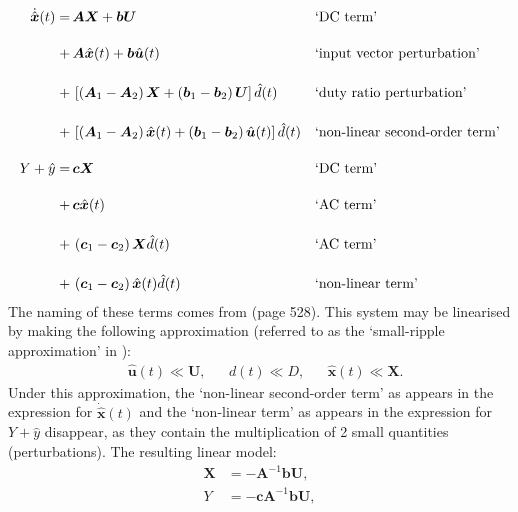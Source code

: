 \begin{align*}
\dot{\hat{\boldsymbol{x}}}(t)
= \, &\boldsymbol{A} \boldsymbol{X} + \boldsymbol{b} \boldsymbol{U}
&&\text{`DC term'}
\\[11pt]
+ \, &\boldsymbol{A} \hat{\boldsymbol{x}}(t) + \boldsymbol{b} \hat{\boldsymbol{u}}(t)
&&\text{`input vector perturbation'}
\\[11pt]
+ \, &\left[\left(\boldsymbol{A}_1 - \boldsymbol{A}_2\right)\boldsymbol{X} + \left(\boldsymbol{b}_1 - \boldsymbol{b}_2\right)\boldsymbol{U}\right] \hat{d}(t)
&&\text{`duty ratio perturbation'}
\\[11pt]
+ \, &\left[\left(\boldsymbol{A}_1 - \boldsymbol{A}_2\right)\hat{\boldsymbol{x}}(t) + \left(\boldsymbol{b}_1 - \boldsymbol{b}_2\right)\hat{\boldsymbol{u}}(t)\right] \hat{d}(t)
&&\text{`non-linear second-order term'}
\\[11pt]
Y + \hat{y} = \, &\boldsymbol{c} \boldsymbol{X}
&&\text{`DC term'}
\\[11pt]
+ \, &\boldsymbol{c} \hat{\boldsymbol{x}}(t)
&&\text{`AC term'}
\\[11pt]
+ \, &\left(\boldsymbol{c}_1 - \boldsymbol{c}_2\right) \boldsymbol{X} \hat{d}(t)
&&\text{`AC term'}
\\[11pt]
+ \, &\left(\boldsymbol{c}_1 - \boldsymbol{c}_2\right) \hat{\boldsymbol{x}}(t) \hat{d}(t)
&&\text{`non-linear term'}
\end{align*}
\endgroup
The naming of these terms comes from \cite{cuk} (page 528).
\newpar
This system may be linearised by making the following approximation (referred to as the `small-ripple approximation' in \cite{cuk}):
\begin{align}
&\hat{\boldsymbol{u}}(t) \ll \boldsymbol{U},
&&d(t) \ll D,
&&\hat{\boldsymbol{x}}(t) \ll \boldsymbol{X}.
\label{eqn:smallripple}
\end{align}
Under this approximation, the `non-linear second-order term' as appears in the expression for $\dot{\hat{\boldsymbol{x}}}(t)$ and the `non-linear term' as appears in the expression for $Y + \hat{y}$ disappear, as they contain the multiplication of 2 small quantities (perturbations).
\newpar
The resulting linear model:
\begin{align}
\boldsymbol{X} &= \minus \boldsymbol{A}^{-1} \boldsymbol{b} \boldsymbol{U},
\nonumber
\\[11pt]
Y &= \minus \boldsymbol{c} \boldsymbol{A}^{-1} \boldsymbol{b} \boldsymbol{U},
\label{eqn:modelY}
\end{align}
